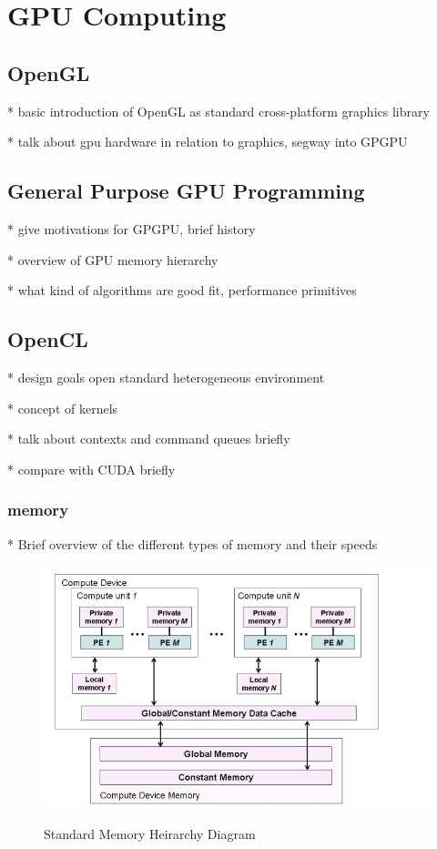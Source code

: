 \chapter{GPU Computing}

\section{OpenGL}
* basic introduction of OpenGL as standard cross-platform graphics library


* talk about gpu hardware in relation to graphics, segway into GPGPU


\section{General Purpose GPU Programming}

* give motivations for GPGPU, brief history


* overview of GPU memory hierarchy


* what kind of algorithms are good fit, performance primitives

\section{OpenCL}

* design goals
    open standard
    heterogeneous environment

* concept of kernels 


* talk about contexts and command queues briefly


* compare with CUDA briefly


\subsection{memory}
* Brief overview of the different types of memory and their speeds
\begin{figure}[!htc]
 		\centering
		\includegraphics[scale=0.5]{figures/gpu_memory.png}
		\label{fig:logic}
        \caption{ Standard Memory Heirarchy Diagram }
\end{figure}

